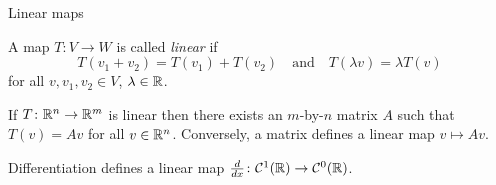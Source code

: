 \documentclass{beamer}
\begin{document}
\begin{frame}
{Linear maps}


\begin{Definition}
A map \(T\colon V\to W\) is called {\em linear} if
\[T(v_1+v_2)=T(v_1)+T(v_2)\quad \mbox{and}\quad T(\lambda
v)=\lambda T(v)\] for all \(v,v_1,v_2\in V\), \(\lambda\in\mathbb{R}\).


\end{Definition}
\begin{Theorem}
If \(T\colon\mathbb{R}^n\to\mathbb{R}^m\) is linear then there exists an
\(m\)-by-\(n\) matrix \(A\) such that \(T(v)=Av\) for all
\(v\in\mathbb{R}^n\). Conversely, a matrix defines a linear map
\(v\mapsto Av\).


\end{Theorem}
\begin{Example}
Differentiation defines a linear map
\(\frac{d}{dx}\colon\mathcal{C}^1(\mathbb{R})\to\mathcal{C}^0(\mathbb{R})\).


\end{Example}
\end{frame}
\end{document}

